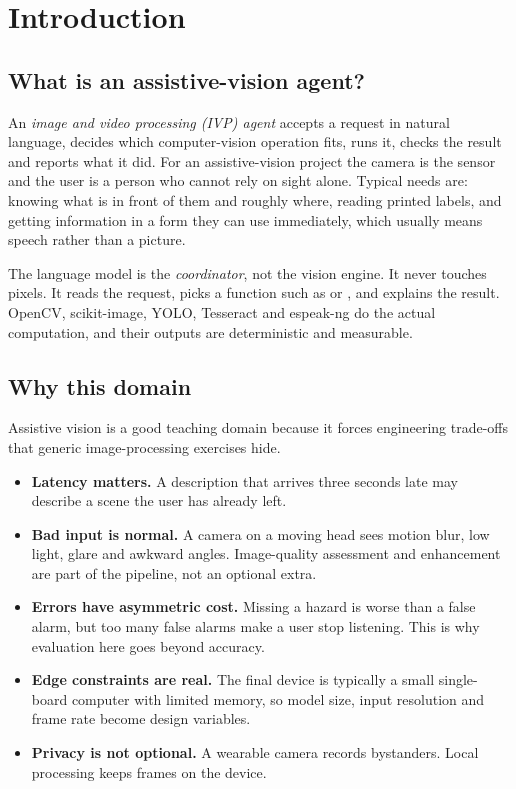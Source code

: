 \chapter{Introduction}

\section{What is an assistive-vision agent?}
An \emph{image and video processing (IVP) agent} accepts a request in natural language, decides which
computer-vision operation fits, runs it, checks the result and reports what it did. For an assistive-vision project the
camera is the sensor and the user is a person who cannot rely on sight alone. Typical needs are:
knowing what is in front of them and roughly where, reading printed labels, and getting information in a form they can
use immediately, which usually means speech rather than a picture.

The language model is the \emph{coordinator}, not the vision engine. It never touches pixels. It reads the request,
picks a function such as  or , and explains the result. OpenCV,
scikit-image, YOLO, Tesseract and espeak-ng do the actual computation, and their outputs are deterministic and measurable.

\section{Why this domain}
Assistive vision is a good teaching domain because it forces engineering trade-offs that generic image-processing
exercises hide.
\begin{itemize}
  \item \textbf{Latency matters.} A description that arrives three seconds late may describe a scene the user has already left.
  \item \textbf{Bad input is normal.} A camera on a moving head sees motion blur, low light, glare and awkward angles. Image-quality assessment and enhancement are part of the pipeline, not an optional extra.
  \item \textbf{Errors have asymmetric cost.} Missing a hazard is worse than a false alarm, but too many false alarms make a user stop listening. This is why evaluation here goes beyond accuracy.
  \item \textbf{Edge constraints are real.} The final device is typically a small single-board computer with limited memory, so model size, input resolution and frame rate become design variables.
  \item \textbf{Privacy is not optional.} A wearable camera records bystanders. Local processing keeps frames on the device.
\end{itemize}

